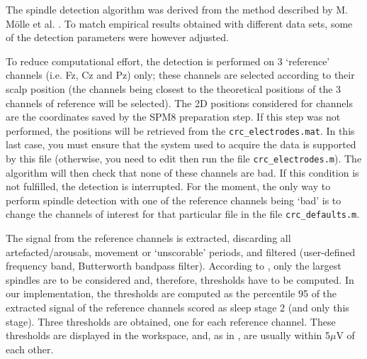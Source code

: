 \documentclass[a4paper,titlepage]{article}
\begin{document}
The spindle detection algorithm was derived from the method described by M. M\"{o}lle et al. \cite{Moelle2002}. To match empirical results obtained with different data sets, some of the detection parameters were however adjusted. 

To reduce computational effort, the detection is performed on 3 `reference' channels (i.e. Fz, Cz and Pz) only; these channels are selected according to their scalp position (the channels being closest to the theoretical positions of the 3 channels of reference will be selected). The 2D positions considered for channels are the coordinates saved by the SPM8 preparation step. If this step was not performed, the positions will be retrieved from the {\tt crc\_electrodes.mat}. In this last case, you must ensure that the system used to acquire the data is supported by this file (otherwise, you need to edit then run the file {\tt crc\_electrodes.m}). The algorithm will then check that none of these channels are bad. If this condition is not fulfilled, the detection is interrupted. For the moment, the only way to perform spindle detection with one of the reference channels being `bad' is to change the channels of interest for that particular file in the file {\tt crc\_defaults.m}.

The signal from the reference channels is extracted, discarding all artefacted/arousals, movement or `unscorable' periods, and filtered (user-defined frequency band, Butterworth bandpass filter). According to  \cite{Moelle2002}, only the largest spindles are to be considered and, therefore, thresholds have to be computed. In our implementation, the thresholds are computed as the percentile 95 of the extracted signal of the reference channels scored as sleep stage 2 (and only this stage). Three thresholds are obtained, one for each reference channel. These thresholds are displayed in the workspace, and, as in \cite{Moelle2002}, are usually within 5$\mu$V of each other. %
\end{document}
